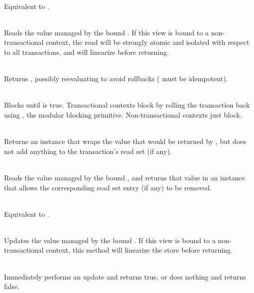 {
\setlength{\leftskip}{12pt}
\setlength{\parindent}{-12pt}
\setlength{\parskip}{3pt}

\vspace{4pt}

\\ Equivalent to .

\\ Reads the value managed by the
bound .  If this view is bound to a non-transactional context,
the read will be strongly atomic and isolated with respect to all
transactions, and will linearize before returning.

\code{map[}\code{](f: }\code{ => }\code{): }\\
Returns , possibly reevaluating 
to avoid rollbacks ( must be idempotent).

\code{ => }\code{) }\\ Blocks
until  is true.  Transactional contexts block by rolling
the transaction back using , the modular blocking primitive.
Non-transactional contexts just block.

\code{[}\code{] }\\
Returns an instance that wraps the value that would be returned by
, but does not add anything to the transaction's read set
(if any).

\code{[}\code{] }\\
Reads the value managed by the bound , and returns that
value in an instance that allows the corresponding read set entry (if any)
to be removed.

\vspace{4pt}

\code{) }\\ Equivalent to .

\code{) }\\ Updates the value managed by the
bound .  If this view is bound to a non-transactional context,
this method will linearize the store before returning.

\code{): }\\ Immediately
performs an update and returns true, or does nothing and returns false.

}

